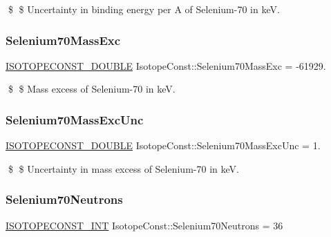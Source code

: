 \$ \$ Uncertainty in binding energy per A of Selenium-\/70 in keV. \mbox{\label{group___isotope_const-_selenium-_se70_gaf2f69a68c18d190ca0ee07954a803006}} 
\subsubsection{\texorpdfstring{Selenium70\+Mass\+Exc}{Selenium70MassExc}}
{\footnotesize\ttfamily \mbox{\hyperlink{group___isotope_const-_macros_ga8f45a7272ce02c0b4c65c44636ed719a}{I\+S\+O\+T\+O\+P\+E\+C\+O\+N\+S\+T\+\_\+\+D\+O\+U\+B\+LE}} Isotope\+Const\+::\+Selenium70\+Mass\+Exc = -\/61929.}

\$ \$ Mass excess of Selenium-\/70 in keV. \mbox{\label{group___isotope_const-_selenium-_se70_ga69adbf80d5e97c989be26d535f5dabc3}} 
\subsubsection{\texorpdfstring{Selenium70\+Mass\+Exc\+Unc}{Selenium70MassExcUnc}}
{\footnotesize\ttfamily \mbox{\hyperlink{group___isotope_const-_macros_ga8f45a7272ce02c0b4c65c44636ed719a}{I\+S\+O\+T\+O\+P\+E\+C\+O\+N\+S\+T\+\_\+\+D\+O\+U\+B\+LE}} Isotope\+Const\+::\+Selenium70\+Mass\+Exc\+Unc = 1.}

\$ \$ Uncertainty in mass excess of Selenium-\/70 in keV. \mbox{\label{group___isotope_const-_selenium-_se70_ga91a2e994fbc0f65f79502502ca167854}} 
\subsubsection{\texorpdfstring{Selenium70\+Neutrons}{Selenium70Neutrons}}
{\footnotesize\ttfamily \mbox{\hyperlink{group___isotope_const-_macros_ga5f18360b3e99483a35c32d789e62621c}{I\+S\+O\+T\+O\+P\+E\+C\+O\+N\+S\+T\+\_\+\+I\+NT}} Isotope\+Const\+::\+Selenium70\+Neutrons = 36}

